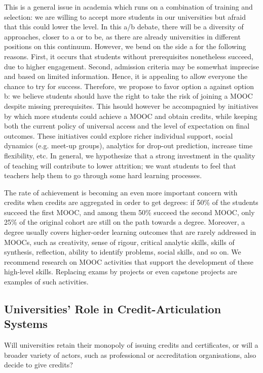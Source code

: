 This is a general issue in academia which runs on a combination of training and selection: we are willing to
accept more students in our universities but afraid that this could lower the level.
In this a/b debate, there will be a diversity of approaches, closer to a or to be, 
as there are already universities in different positions on this continuum. However,
we bend on the side a for the following reasons. 
First, it occurs that students without prerequisites nonetheless succeed, due to higher
engagement. Second,  admission criteria may be somewhat
imprecise and based on limited information. Hence, it is appealing to allow
everyone the chance to try for success. Therefore, we propose to favor option a against option b: 
we believe students should have the right to take the risk of joining a MOOC despite missing
prerequisites. This hsould however be accompagnied by initiatives by which more students
could achieve a MOOC and obtain credits, while keeping both the current
policy of universal access and the level of expectation on final outcomes. 
These initiatives could explore richer
individual support, social dynamics (e.g. meet-up groups), analytics for
drop-out prediction, increase time flexibility, etc. In general, we
hypothesize that a strong investment in the quality of teaching will
contribute to lower attrition; we want students to feel that teachers
help them to go through some hard learning processes. 

The rate of achievement is becoming an even more important concern with
credits when credits are  aggregated in order to get degrees:
if 50\% of the students succeed the first MOOC, and among them 50\%
succeed the second MOOC, only 25\% of the original cohort are still on
the path towards a degree. Moreover, a degree usually covers
higher-order learning outcomes that are rarely addressed in MOOCs, such
as creativity, sense of rigour, critical
analytic skills, skills of synthesis, reflection, ability to identify
problems, social skills, and so on. We
recommend research on MOOC activities that support the development of
these high-level skills. Replacing exams by projects or even capstone
projects are examples of such activities.


\subsection{Universities' Role in Credit-Articulation Systems}

Will  universities retain their monopoly
of issuing credits and certificates, or will a broader variety of actors,
such as professional or accreditation organisations, 
also decide to give credits?  

